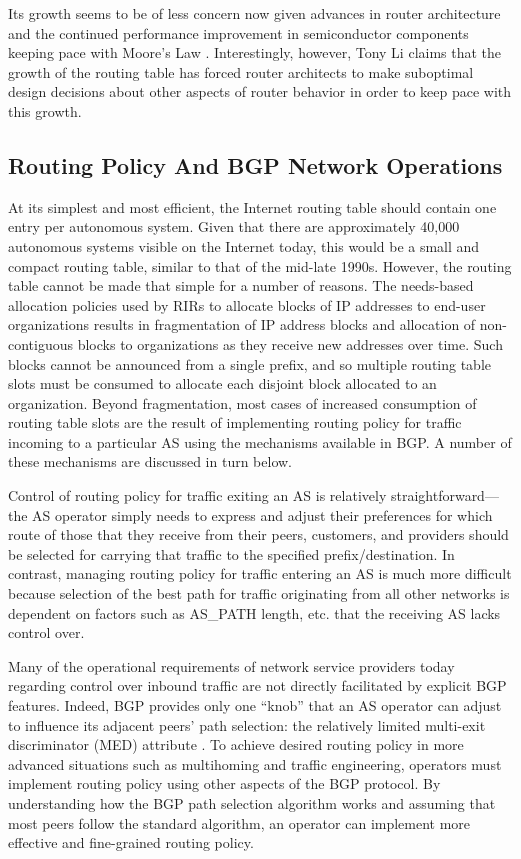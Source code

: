 
Its growth seems to be of less concern now given advances in router
architecture and the continued performance improvement in semiconductor
components keeping pace with Moore's Law \cite{McKeown:2006kx}. Interestingly,
however, Tony Li claims that the growth of the routing table has forced router
architects to make suboptimal design decisions about other aspects of router
behavior in order to keep pace with this growth.

\subsection{Routing Policy And BGP Network Operations}

At its simplest and most efficient, the Internet routing table should contain
one entry per autonomous system. Given that there are approximately 40,000
autonomous systems visible on the Internet today, this would be a small and
compact routing table, similar to that of the mid-late 1990s. However, the
routing table cannot be made that simple for a number of reasons. The
needs-based allocation policies used by RIRs \cite{rfc2050} to allocate blocks
of IP addresses to end-user organizations results in fragmentation of IP
address blocks and allocation of non-contiguous blocks to organizations as they
receive new addresses over time. Such blocks cannot be announced from a single
prefix, and so multiple routing table slots must be consumed to allocate each
disjoint block allocated to an organization. Beyond fragmentation, most cases
of increased consumption of routing table slots are the result of implementing
routing policy for traffic incoming to a particular AS using the mechanisms
available in BGP. A number of these mechanisms are discussed in turn below.

Control of routing policy for traffic exiting an AS is relatively
straightforward---the AS operator simply needs to express and adjust their
preferences for which route of those that they receive from their peers,
customers, and providers should be selected for carrying that traffic to the
specified prefix/destination. In contrast, managing routing policy for traffic
entering an AS is much more difficult because selection of the best path for
traffic originating from all other networks is dependent on factors such as
AS\_PATH length, etc. that the receiving AS lacks control over.

Many of the operational requirements of network service providers today
regarding control over inbound traffic are not directly facilitated by explicit
BGP features. Indeed, BGP provides only one ``knob'' that an AS operator can
adjust to influence its adjacent peers' path selection: the relatively limited
multi-exit discriminator (MED) attribute \cite{Beijnum:2002oq}. To achieve
desired routing policy in more advanced situations such as multihoming and
traffic engineering, operators must implement routing policy using other
aspects of the BGP protocol. By understanding how the BGP path selection
algorithm works and assuming that most peers follow the standard algorithm, an
operator can implement more effective and fine-grained routing policy.

